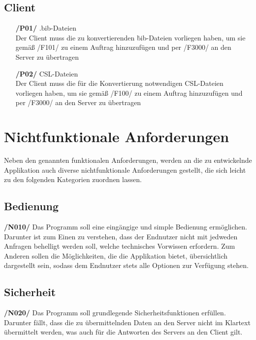 \documentclass[11pt]{article} %
\begin{document}
\subsection{Client}

\begin{itemize}
\item[\textbf{/P01/} .bib-Dateien]{\ \\Der Client muss die zu konvertierenden \.bib-Dateien vorliegen haben, um sie gemäß /F101/ zu einem Auftrag hinzuzufügen und per /F3000/ an den Server zu übertragen}
\item[\textbf{/P02/} CSL-Dateien]{\ \\Der Client muss die für die Konvertierung notwendigen CSL-Dateien vorliegen haben, um sie gemäß /F100/ zu einem Auftrag hinzuzufügen und per /F3000/ an den Server zu übertragen}
\end{itemize}

\clearpage

\section{Nichtfunktionale Anforderungen}

Neben den genannten funktionalen Anforderungen, werden an die zu entwickelnde Applikation auch diverse nichtfunktionale Anforderungen gestellt, die sich leicht zu den folgenden Kategorien zuordnen lassen.

\subsection{Bedienung}

\textbf{/N010/} Das Programm soll eine eingängige und simple Bedienung ermöglichen. Darunter ist zum Einen zu verstehen, dass der Endnutzer nicht mit jedweden Anfragen behelligt werden soll, welche technisches Vorwissen erfordern. Zum Anderen sollen die Möglichkeiten, die die Applikation bietet, übersichtlich dargestellt sein, sodass dem Endnutzer stets alle Optionen zur Verfügung stehen.

\subsection{Sicherheit}

\textbf{/N020/} Das Programm soll grundlegende Sicherheitsfunktionen erfüllen. Darunter fällt, dass die zu übermittelnden Daten an den Server nicht im Klartext übermittelt werden, was auch für die Antworten des Servers an den Client gilt.
\end{document}
